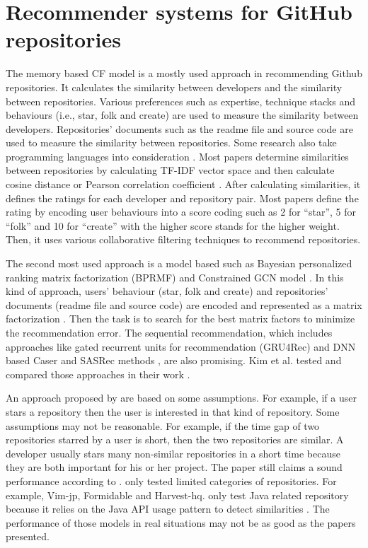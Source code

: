 \documentclass[11pt,twoside]{report}
\begin{document}
\section{Recommender systems for GitHub repositories}
The memory based CF model is a mostly used approach in recommending Github repositories. It calculates the similarity between developers and the similarity between repositories. Various preferences such as expertise, technique stacks and behaviours (i.e., star, folk and create) are used to measure the similarity between developers. Repositories' documents such as the readme file and source code are used to measure the similarity between repositories. Some research also take programming languages into consideration \cite{inka_open_2018, sun_personalized_2018}. Most papers determine similarities between repositories by calculating TF-IDF vector space and then calculate cosine distance or Pearson correlation coefficient \cite{mansur_review_nodate, kim_sequential_2021}. After calculating similarities, it defines the ratings for each developer and repository pair. Most papers define the rating by encoding user behaviours into a score coding such as 2 for “star”, 5 for “folk” and 10 for “create” with the higher score stands for the higher weight. Then, it uses various collaborative filtering techniques to recommend repositories.

The second most used approach is a model based such as Bayesian personalized ranking matrix factorization (BPRMF) \cite{jiang_open_2017} and Constrained GCN model \cite{shao_paper2repo_2020}. In this kind of approach, users’ behaviour (star, folk and create) and repositories’ documents (readme file and source code) are encoded and represented as a matrix factorization \cite{jiang_open_2017}. Then the task is to search for the best matrix factors to minimize the recommendation error. The sequential recommendation, which includes approaches like gated recurrent units for recommendation (GRU4Rec) and DNN based Caser and SASRec methods \cite{kim_sequential_2021}, are also promising. Kim et al. \cite{kim_sequential_2021} tested and compared those approaches in their work \cite{kim_sequential_2021}.

An approach proposed by \cite{zhang_detecting_2017} are based on some assumptions. For example, if a user stars a repository then the user is interested in that kind of repository. Some assumptions may not be reasonable. For example, if the time gap of two repositories starred by a user is short, then the two repositories are similar. A developer usually stars many non-similar repositories in a short time because they are both important for his or her project. The paper still claims a sound performance according to \cite{zhang_detecting_2017}. \cite{xu_repersp_2017, sun_personalized_2018, zhang_detecting_2017} only tested limited categories of repositories. For example, Vim-jp, Formidable and Harvest-hq. \cite{sun_personalized_2018} only test Java related repository because it relies on the Java API usage pattern to detect similarities \cite{zhang_detecting_2017}. The performance of those models in real situations may not be as good as the papers presented.
\end{document}
